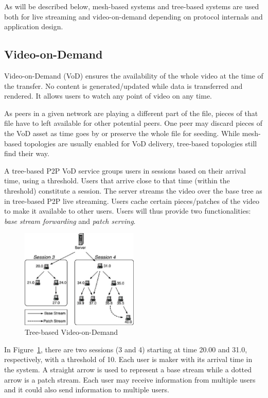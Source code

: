 As will be described below, mesh-based systems and tree-based systems are used
both for live streaming and video-on-demand depending on protocol internals
and application design.

\subsection{Video-on-Demand}
\label{subsec:p2p-systems:vod}

Video-on-Demand (VoD) ensures the availability of the whole video at the time
of the transfer. No content is generated/updated while data is transferred and
rendered. It allows users to watch any point of video on any time.

As peers in a given network are playing a different part of the file, pieces
of that file have to left available for other potential peers. One peer may
discard pieces of the VoD asset as time goes by or preserve the whole file for
seeding. While mesh-based topologies are usually enabled for VoD delivery,
tree-based topologies still find their way.

A tree-based P2P VoD service groups users in sessions based on their arrival
time, using a threshold. Users that arrive close to that time (within the
threshold) constitute a session. The server streams the video over the base
tree as in tree-based P2P live streaming. Users cache certain pieces/patches
of the video to make it available to other users. Users will thus provide two
functionalities: \textit{base stream forwarding} and \textit{patch serving}.

\begin{figure}
  \centering
  \includegraphics[width=0.5\textwidth]{src/img/p2p-systems/tree-based-vod}
  \caption{Tree-based Video-on-Demand}
  \label{fig:p2p-systems:tree-based-vod}
\end{figure}

In Figure~\ref{fig:p2p-systems:tree-based-vod}, there are two sessions (3 and 4) starting
at time 20.00 and
31.0, respectively, with a threshold of 10. Each user is maker with its
arrival time in the system. A straight arrow is used to represent a base
stream while a dotted arrow is a patch stream. Each user may receive
information from multiple users and it could also send information to multiple
users.

